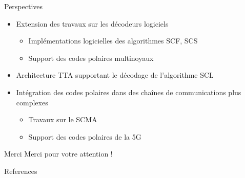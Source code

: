 \begin{frame}[c]{Perspectives}

  \begin{itemize}
    \renewcommand*{\bibfont}{\scriptsize}
    \vfill
    \item<+-> Extension des travaux sur les décodeurs logiciels
    \begin{itemize}
      \item Implémentations logicielles des algorithmes SCF, SCS
      \item Support des codes polaires multinoyaux
    \end{itemize}
    \vfill
    \item<+-> Architecture TTA supportant le décodage de l'algorithme SCL
    \vfill
    \item<+-> Intégration des codes polaires dans des chaînes de communications plus complexes
    \begin{itemize}
      \item Travaux sur le SCMA
      \item Support des codes polaires de la 5G
    \end{itemize}
    \vfill
  \end{itemize}

\end{frame}

\begin{frame}[c]{Merci}
\vfill
Merci pour votre attention !
\vfill
\end{frame}

\begin{frame}[allowframebreaks]{References}
\renewcommand*{\bibfont}{\scriptsize}

\printbibliography
\end{frame}
